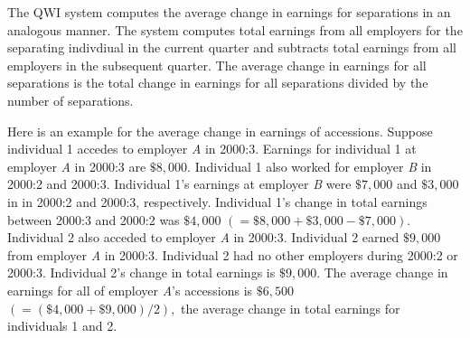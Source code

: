 The QWI system computes the average change in earnings for separations in an
analogous manner. The system computes total earnings from all employers for
the separating indivdiual in the current quarter and subtracts total
earnings from all employers in the subsequent quarter. The average change in
earnings for all separations is the total change in earnings for all
separations divided by the number of separations.

Here is an example for the average change in earnings of accessions. Suppose
individual 1 accedes to employer \textit{A} in 2000:3. Earnings for
individual 1 at employer \textit{A} in 2000:3 are $\$8,000$. Individual 1
also worked for employer \textit{B} in 2000:2 and 2000:3. Individual 1's
earnings at employer \textit{B} were $\$7,000$ and $\$3,000$ in in 2000:2
and 2000:3, respectively. Individual 1's change in total earnings between
2000:3 and 2000:2 was $\$4,000$ $\left( =\$8,000+\$3,000-\$7,000\right) .$
Individual 2 also acceded to employer \textit{A} in 2000:3. Individual 2
earned $\$9,000$ from employer \textit{A} in 2000:3. Individual 2 had no
other employers during 2000:2 or 2000:3. Individual 2's change in total
earnings is $\$9,000.$ The average change in earnings for all of employer 
\textit{A}'s accessions is $\$6,500$ $\left( =\left( \$4,000+\$9,000\right)
/2\right) ,$ the average change in total earnings for individuals 1 and 2.


  

